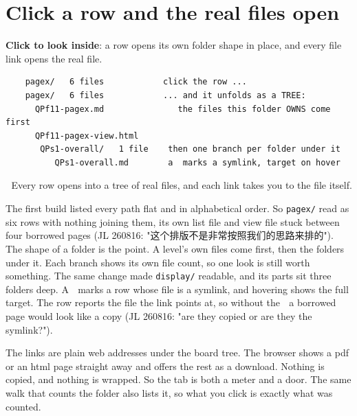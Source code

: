 \section{Click a row and the real files open}
\textbf{Click to look inside}: a row opens its own folder shape in place, and every file link opens the real file.

\begin{verbatim}
    pagex/   6 files            click the row ...
    pagex/   6 files            ... and it unfolds as a TREE:
      QPf11-pagex.md               the files this folder OWNS come first
      QPf11-pagex-view.html
       QPs1-overall/   1 file    then one branch per folder under it
          QPs1-overall.md        a  marks a symlink, target on hover
\end{verbatim}
📌 Every row opens into a tree of real files, and each link takes you to the file itself.

The first build listed every path flat and in alphabetical order. So \texttt{pagex/} read as six rows with nothing joining them, its own list file and view file stuck between four borrowed pages (JL 260816: "这个排版不是非常按照我们的思路来排的"). The shape of a folder is the point. A level's own files come first, then the folders under it. Each branch shows its own file count, so one look is still worth something. The same change made \texttt{display/} readable, and its parts sit three folders deep. A 🔗 marks a row whose file is a symlink, and hovering shows the full target. The row reports the file the link points at, so without the 🔗 a borrowed page would look like a copy (JL 260816: "are they copied or are they the symlink?").

The links are plain web addresses under the board tree. The browser shows a pdf or an html page straight away and offers the rest as a download. Nothing is copied, and nothing is wrapped. So the tab is both a meter and a door. The same walk that counts the folder also lists it, so what you click is exactly what was counted.

